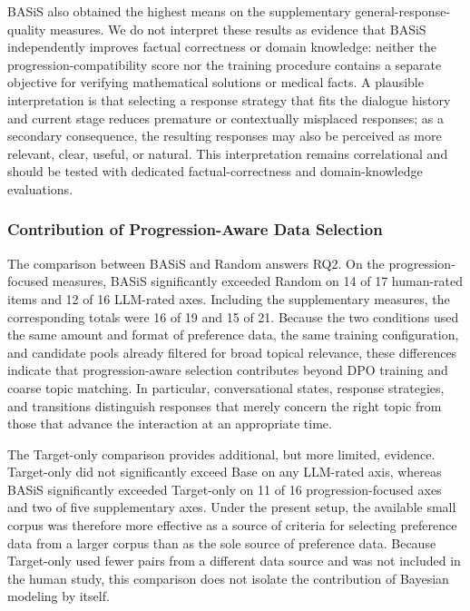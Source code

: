 \documentclass[manuscript,review,anonymous]{acmart}
\begin{document}
BASiS also obtained the highest means on the supplementary general-response-quality measures. We do not interpret these results as evidence that BASiS independently improves factual correctness or domain knowledge: neither the progression-compatibility score nor the training procedure contains a separate objective for verifying mathematical solutions or medical facts. A plausible interpretation is that selecting a response strategy that fits the dialogue history and current stage reduces premature or contextually misplaced responses; as a secondary consequence, the resulting responses may also be perceived as more relevant, clear, useful, or natural. This interpretation remains correlational and should be tested with dedicated factual-correctness and domain-knowledge evaluations.

\subsubsection{Contribution of Progression-Aware Data Selection}

The comparison between BASiS and Random answers RQ2. On the progression-focused measures, BASiS significantly exceeded Random on 14 of 17 human-rated items and 12 of 16 LLM-rated axes. Including the supplementary measures, the corresponding totals were 16 of 19 and 15 of 21. Because the two conditions used the same amount and format of preference data, the same training configuration, and candidate pools already filtered for broad topical relevance, these differences indicate that progression-aware selection contributes beyond DPO training and coarse topic matching. In particular, conversational states, response strategies, and transitions distinguish responses that merely concern the right topic from those that advance the interaction at an appropriate time.

The Target-only comparison provides additional, but more limited, evidence. Target-only did not significantly exceed Base on any LLM-rated axis, whereas BASiS significantly exceeded Target-only on 11 of 16 progression-focused axes and two of five supplementary axes. Under the present setup, the available small corpus was therefore more effective as a source of criteria for selecting preference data from a larger corpus than as the sole source of preference data. Because Target-only used fewer pairs from a different data source and was not included in the human study, this comparison does not isolate the contribution of Bayesian modeling by itself.
\end{document}
